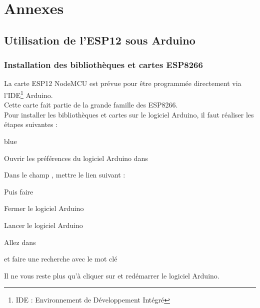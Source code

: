 \appendix
\part{Annexes}
\chapter{Utilisation de l'ESP12 sous Arduino}


\section{Installation des bibliothèques et cartes ESP8266}

La carte ESP12 NodeMCU est prévue pour être programmée directement via l'IDE\footnote{IDE : Environnement de Développement Intégré} Arduino.\\
Cette carte fait partie de la grande famille des ESP8266.\\
Pour installer les bibliothèques et cartes sur le logiciel Arduino, il faut réaliser les étapes suivantes : 


\begin{items}{blue}{\Triangle}

    \item Ouvrir les préférences du logiciel Arduino dans 

    \item Dans le champ , mettre le lien suivant : \\
    
    Puis faire 

    

    \item Fermer le logiciel Arduino

    \item Lancer le logiciel Arduino
    \item Allez dans  
    
    et faire une recherche avec le mot clé 


    Il ne vous reste plus qu'à cliquer sur  et redémarrer le logiciel Arduino.
\end{items}



